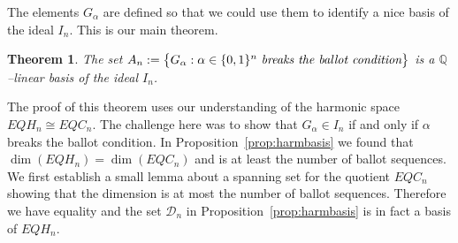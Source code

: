 \documentclass[submission]{FPSAC2023}
\newcommand{\defncolor}{\color{darkred}}
\newcommand{\defn}[1]{{\defncolor\emph{#1}}} %
\newtheorem{theorem}{Theorem}[section]
\theoremstyle{definition}
\newtheorem{example}[theorem]{Example}
\numberwithin{equation}{section}
\begin{document}
%

The elements $G_\alpha$ are defined so that we could use them to
identify a nice basis of the ideal $I_n$. This is our main theorem.

\begin{theorem}\label{thm:basisofideal}
The set $A_n:=\big\{ G_\alpha : \alpha \in \{0,1\}^n \text{ \it breaks the ballot condition}\big\}$
is a $\mathbb Q$--linear basis of the ideal $I_n$.
\end{theorem}

The proof of this theorem uses our understanding of the harmonic space $EQH_n\cong EQC_n$.
The challenge here was to show that $G_\alpha \in I_n$ if and only if $\alpha$ breaks the ballot condition.
In Proposition~\ref{prop:harmbasis} we found that $\dim(EQH_n)=\dim(EQC_n)$ and is at least the number of ballot sequences.
We first establish a small lemma about a spanning set for the quotient $EQC_n$ showing that  the dimension is at most  the number of ballot sequences.
Therefore we have equality
and the set ${\mathcal D}_n$ in Proposition~\ref{prop:harmbasis} is in fact a basis
of $EQH_n$.
\end{document}
